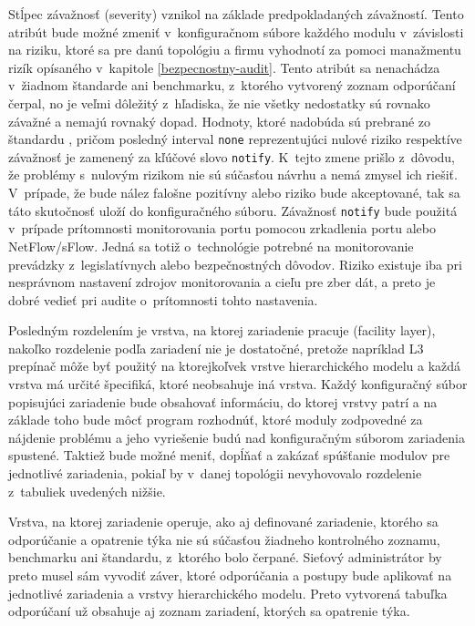 Stĺpec závažnosť (severity) vznikol na základe predpokladaných závažností. Tento atribút bude možné zmeniť v~konfiguračnom súbore každého modulu v~závislosti na riziku, ktoré sa pre danú topológiu a firmu vyhodnotí za pomoci manažmentu rizík opísaného v~kapitole \ref{bezpecnostny-audit}. Tento atribút sa nenachádza v~žiadnom štandarde ani benchmarku, z~ktorého vytvorený zoznam odporúčaní čerpal, no je veľmi dôležitý z~hľadiska, že nie všetky nedostatky sú rovnako závažné a nemajú rovnaký dopad. Hodnoty, ktoré nadobúda sú prebrané zo štandardu , pričom posledný interval \texttt{none} reprezentujúci nulové riziko respektíve závažnosť je zamenený za kľúčové slovo \texttt{notify}. K~tejto zmene prišlo z~dôvodu, že problémy s~nulovým rizikom nie sú súčasťou návrhu a nemá zmysel ich riešiť. V~prípade, že bude nález falošne pozitívny alebo riziko bude akceptované, tak sa táto skutočnosť uloží do konfiguračného súboru. Závažnosť \texttt{notify} bude použitá v~prípade prítomnosti monitorovania portu pomocou zrkadlenia portu alebo NetFlow/sFlow. Jedná sa totiž o~technológie potrebné na monitorovanie prevádzky z~legislatívnych alebo bezpečnostných dôvodov. Riziko existuje iba pri nesprávnom nastavení zdrojov monitorovania a cieľu pre zber dát, a preto je dobré vedieť pri audite o~prítomnosti tohto nastavenia.
 

Posledným rozdelením je vrstva, na ktorej zariadenie pracuje (facility layer), nakoľko rozdelenie podľa zariadení nie je dostatočné, pretože napríklad L3 prepínač môže byť použitý na ktorejkoľvek vrstve hierarchického modelu a každá vrstva má určité špecifiká, ktoré neobsahuje iná vrstva. Každý konfiguračný súbor popisujúci zariadenie bude obsahovať informáciu, do ktorej vrstvy patrí a na základe toho bude môcť program rozhodnúť, ktoré moduly zodpovedné za nájdenie problému a jeho vyriešenie budú nad konfiguračným súborom zariadenia spustené. Taktiež bude možné meniť, dopĺňať a zakázať spúšťanie modulov pre jednotlivé zariadenia, pokiaľ by v~danej topológii nevyhovovalo rozdelenie z~tabuliek uvedených nižšie. 

Vrstva, na ktorej zariadenie operuje, ako aj definované zariadenie, ktorého sa odporúčanie a opatrenie týka nie sú súčasťou žiadneho kontrolného zoznamu, benchmarku ani štandardu, z~ktorého bolo čerpané. Sieťový administrátor by preto musel sám vyvodiť záver, ktoré odporúčania a postupy bude aplikovať na jednotlivé zariadenia a vrstvy hierarchického modelu. Preto vytvorená tabuľka odporúčaní už obsahuje aj zoznam zariadení, ktorých sa opatrenie týka.

